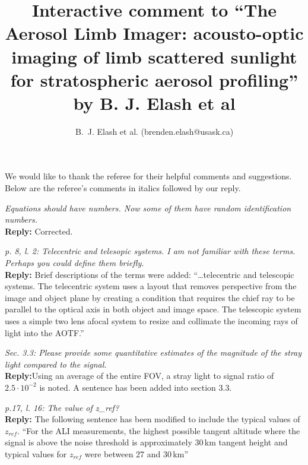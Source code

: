 \documentclass[12pt, notitlepage]{article}
\title{Interactive comment to ``The Aerosol Limb Imager: acousto-optic imaging of limb scattered
sunlight for stratospheric aerosol profiling'' by B. J. Elash et al}
\author{B.~J. Elash et al. (brenden.elash@usask.ca)}
\begin{document}
\begin{titlepage}
\maketitle
\end{titlepage}


We would like to thank the referee for their helpful comments and suggestions. Below are the referee's comments in italics followed by our reply.

\hrulefill

\textit{Equations should have numbers. Now some of them have random identification numbers.}\\

\textbf{Reply:} Corrected.

\hrulefill

\textit{p. 8, l. 2: Telecentric and telesopic systems. I am not familiar with these terms. Perhaps you could define them briefly.}\\

\textbf{Reply:} Brief descriptions of the terms were added: ``\ldots telecentric and telescopic systems. The telecentric system uses a layout that removes perspective from the image and object plane by creating a condition that requires the chief ray to be parallel to the optical axis in both object and image space. The telescopic system uses a simple two lens afocal system to resize and collimate the incoming rays of light into the AOTF.''

\hrulefill

\textit{Sec. 3.3: Please provide some quantitative estimates of the magnitude of the stray light compared to the signal.}\\

\textbf{Reply:}Using an average of the entire FOV, a stray light to signal ratio of $2.5\cdot10^{-2}$ is noted. A sentence has been added into section 3.3.

\hrulefill

\textit{p.17, l. 16: The value of z\_ref?}\\

\textbf{Reply:} The following sentence has been modified to include the typical values of $z_{ref}$. ``For the ALI measurements, the highest
possible tangent altitude where the signal is above the noise threshold is
approximately 30\,km tangent height and typical values for $z_{ref}$ were between 27 and 30\,km''

\hrulefill
\end{document}
